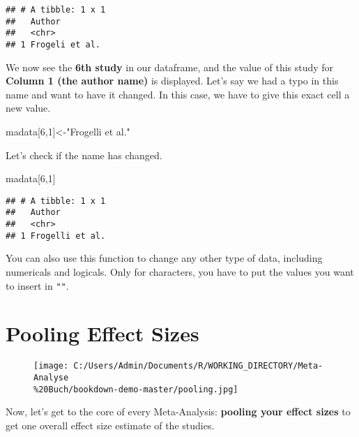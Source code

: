 \documentclass[]{book}
\newenvironment{Shaded}{\begin{snugshade}}{\end{snugshade}}
\newcommand{\DecValTok}[1]{\textcolor[rgb]{0.00,0.00,0.81}{#1}}
\newcommand{\StringTok}[1]{\textcolor[rgb]{0.31,0.60,0.02}{#1}}
\newcommand{\NormalTok}[1]{#1}
\theoremstyle{definition}
\theoremstyle{definition}
\theoremstyle{definition}
\theoremstyle{remark}
\begin{document}
\begin{verbatim}
## # A tibble: 1 x 1
##   Author        
##   <chr>         
## 1 Frogeli et al.
\end{verbatim}

We now see the \textbf{6th study} in our dataframe, and the value of
this study for \textbf{Column 1 (the author name)} is displayed. Let's
say we had a typo in this name and want to have it changed. In this
case, we have to give this exact cell a new value.

\begin{Shaded}
\begin{Highlighting}[]
\NormalTok{madata[}\DecValTok{6}\NormalTok{,}\DecValTok{1}\NormalTok{]<-}\StringTok{"Frogelli et al."}
\end{Highlighting}
\end{Shaded}

Let's check if the name has changed.

\begin{Shaded}
\begin{Highlighting}[]
\NormalTok{madata[}\DecValTok{6}\NormalTok{,}\DecValTok{1}\NormalTok{]}
\end{Highlighting}
\end{Shaded}

\begin{verbatim}
## # A tibble: 1 x 1
##   Author         
##   <chr>          
## 1 Frogelli et al.
\end{verbatim}

You can also use this function to change any other type of data,
including numericals and logicals. Only for characters, you have to put
the values you want to insert in \texttt{""}.

\chapter{Pooling Effect Sizes}\label{pool}

\begin{figure}
\centering
\texttt{[image: C:/Users/Admin/Documents/R/WORKING\_DIRECTORY/Meta-Analyse\\\%20Buch/bookdown-demo-master/pooling.jpg]}
\caption{}
\end{figure}

Now, let's get to the core of every Meta-Analysis: \textbf{pooling your
effect sizes} to get one overall effect size estimate of the studies.
\end{document}
